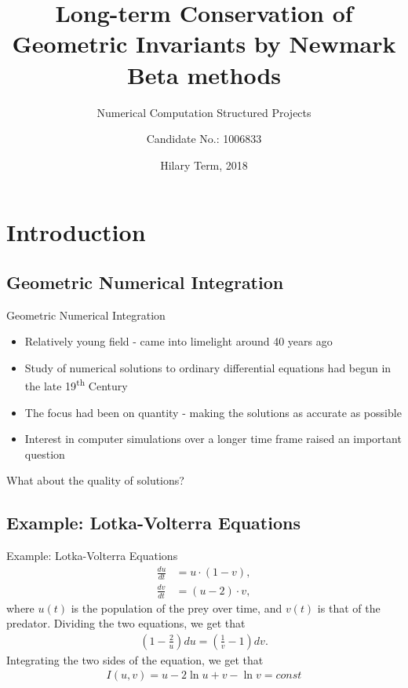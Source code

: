 \documentclass{beamer}
\title{Long-term Conservation of Geometric Invariants by Newmark Beta methods}
\subtitle{Numerical Computation Structured Projects}
\author{Candidate No.: 1006833}
\date{Hilary Term, 2018}
\begin{document}
\setlength{\abovedisplayskip}{3pt}

\begin{frame}
	\titlepage
\end{frame}

\section{Introduction}
\subsection{Geometric Numerical Integration}
\begin{frame}{Geometric Numerical Integration}
	\begin{itemize}
		\item<1->
			Relatively young field - came into limelight around 40 years ago
		\item<1->
			Study of numerical solutions to ordinary differential equations had begun in the late 19\textsuperscript{th} Century
		\item<1->
			The focus had been on quantity - making the solutions as accurate as possible
		\item<1->
			Interest in computer simulations over a longer time frame raised an important question
	\end{itemize}
	 {\centering \alert{What about the quality of solutions?}}
\end{frame}

\subsection[Example]{Example: Lotka-Volterra Equations}
\begin{frame}{Example: Lotka-Volterra Equations}
\begin{align*}
	\frac{du}{dt} &= u\cdot(1-v),\\ 
	\frac{dv}{dt} &= (u-2)\cdot v,
\end{align*}
where $u(t)$ is the population of the prey over time, and $v(t)$ is that of the predator.
Dividing the two equations, we get that
\begin{align*}
\left(1 -  \frac{2}{u}\right) du = \left(\frac{1}{v} - 1\right) dv.
\end{align*}
Integrating the two sides of the equation, we get that
\begin{align*}
I(u, v) = u - 2\ln{u} +  v - \ln{v} = const
\end{align*}
\end{frame}
\end{document}
